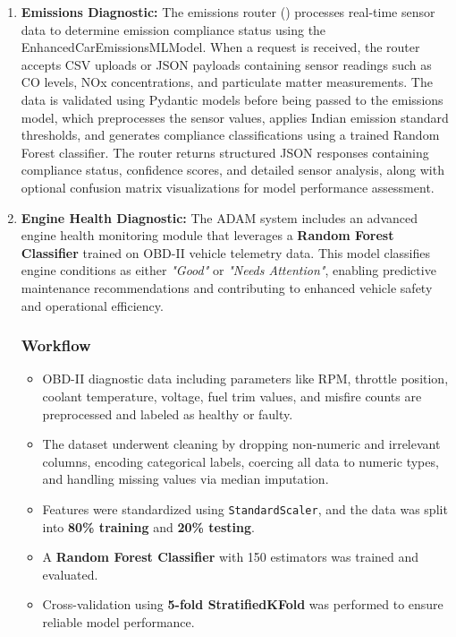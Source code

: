     \begin{enumerate}
        \item \textbf{Emissions Diagnostic:} 
            The emissions router () processes real-time sensor data to determine emission compliance status using the EnhancedCarEmissionsMLModel. When a request is received, the router accepts CSV uploads or JSON payloads containing sensor readings such as CO levels, NOx concentrations, and particulate matter measurements. The data is validated using Pydantic models before being passed to the emissions model, which preprocesses the sensor values, applies Indian emission standard thresholds, and generates compliance classifications using a trained Random Forest classifier. The router returns structured JSON responses containing compliance status, confidence scores, and detailed sensor analysis, along with optional confusion matrix visualizations for model performance assessment.
        \item \textbf{Engine Health Diagnostic:} 
            The ADAM system includes an advanced engine health monitoring module that leverages a \textbf{Random Forest Classifier} trained on OBD-II vehicle telemetry data. This model classifies engine conditions as either \textit{"Good"} or \textit{"Needs Attention"}, enabling predictive maintenance recommendations and contributing to enhanced vehicle safety and operational efficiency.

\subsubsection*{Workflow}

\begin{itemize}
    \item OBD-II diagnostic data including parameters like RPM, throttle position, coolant temperature, voltage, fuel trim values, and misfire counts are preprocessed and labeled as healthy or faulty.
    \item The dataset underwent cleaning by dropping non-numeric and irrelevant columns, encoding categorical labels, coercing all data to numeric types, and handling missing values via median imputation.
    \item Features were standardized using \texttt{StandardScaler}, and the data was split into \textbf{80\% training} and \textbf{20\% testing}.
    \item A \textbf{Random Forest Classifier} with 150 estimators was trained and evaluated.
    \item Cross-validation using \textbf{5-fold StratifiedKFold} was performed to ensure reliable model performance.
\end{itemize}


\end{enumerate}
